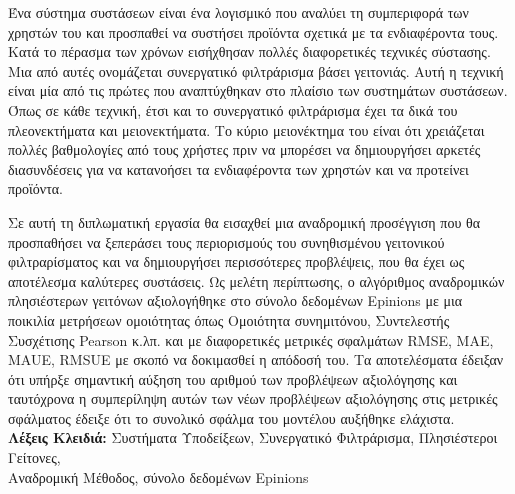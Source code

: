 
Ένα σύστημα συστάσεων είναι ένα λογισμικό που αναλύει τη
συμπεριφορά των χρηστών του και προσπαθεί να συστήσει προϊόντα
σχετικά με τα ενδιαφέροντα τους. Κατά το πέρασμα των χρόνων
εισήχθησαν πολλές διαφορετικές τεχνικές σύστασης. Μια από αυτές ονομάζεται
συνεργατικό φιλτράρισμα βάσει γειτονιάς. Αυτή η τεχνική είναι μία
από τις πρώτες που αναπτύχθηκαν στο πλαίσιο των συστημάτων
συστάσεων. Όπως σε κάθε τεχνική, έτσι και το συνεργατικό φιλτράρισμα έχει τα
δικά του πλεονεκτήματα και μειονεκτήματα. Το κύριο μειονέκτημα του
είναι ότι χρειάζεται πολλές βαθμολογίες από τους χρήστες
πριν να μπορέσει να δημιουργήσει αρκετές διασυνδέσεις
για να κατανοήσει τα ενδιαφέροντα των χρηστών και να προτείνει
προϊόντα.

Σε αυτή τη διπλωματική εργασία θα εισαχθεί μια αναδρομική προσέγγιση που
θα προσπαθήσει να ξεπεράσει τους περιορισμούς του συνηθισμένου
γειτονικού φιλτραρίσματος και να δημιουργήσει
περισσότερες προβλέψεις, που θα έχει ως αποτέλεσμα καλύτερες συστάσεις.
Ως μελέτη περίπτωσης, ο αλγόριθμος αναδρομικών πλησιέστερων γειτόνων
αξιολογήθηκε στο σύνολο δεδομένων Epinions με μια ποικιλία μετρήσεων ομοιότητας
όπως Ομοιότητα συνημιτόνου, Συντελεστής Συσχέτισης Pearson κ.λπ. και με διαφορετικές
μετρικές σφαλμάτων RMSE, MAE, MAUE, RMSUE με σκοπό να δοκιμασθεί η απόδοσή του.
Τα αποτελέσματα έδειξαν ότι υπήρξε σημαντική αύξηση του αριθμού των προβλέψεων αξιολόγησης
και ταυτόχρονα η συμπερίληψη αυτών των νέων προβλέψεων αξιολόγησης
στις μετρικές σφάλματος έδειξε ότι το συνολικό σφάλμα του μοντέλου αυξήθηκε ελάχιστα.\\
\justify
\textbf{Λέξεις Κλειδιά:} Συστήματα Υποδείξεων, Συνεργατικό Φιλτράρισμα,
Πλησιέστεροι Γείτονες, \\Αναδρομική Μέθοδος, σύνολο δεδομένων Epinions
